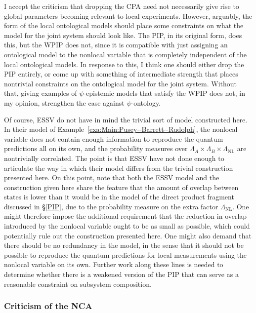 \documentclass[DIV=calc,paper=a4,fontsize=11pt,twocolumn]{scrartcl} %
\theoremstyle{definition}
\theoremstyle{plain}
\begin{document}
I accept the criticism that dropping the CPA need not necessarily give
rise to global parameters becoming relevant to local experiments.
However, arguably, the form of the local ontological models should
place some constraints on what the model for the joint system should
look like.  The PIP, in its original form, does this, but the WPIP
does not, since it is compatible with just assigning an ontological
model to the nonlocal variable that is completely independent of the
local ontological models.  In response to this, I think one should
either drop the PIP entirely, or come up with something of
intermediate strength that places nontrivial constraints on the
ontological model for the joint system.  Without that, giving examples
of $\psi$-epistemic models that satisfy the WPIP does not, in my
opinion, strengthen the case against $\psi$-ontology.

Of course, ESSV do not have in mind the trivial sort of model
constructed here.  In their model of Example~\ref{exa:Main:Pusey--Barrett--Rudolph}, the
nonlocal variable does not contain enough information to reproduce the
quantum predictions all on its own, and the probability measures over
$\Lambda_A \times \Lambda_B \times \Lambda_{\text{NL}}$ are
nontrivially correlated.  The point is that ESSV have not done enough
to articulate the way in which their model differs from the trivial
construction presented here.  On this point, note that both the ESSV
model and the construction given here share the feature that the
amount of overlap between states is lower than it would be in the
model of the direct product fragment discussed in \S\ref{PIP}, due to
the probability measure on the extra factor $\Lambda_{\text{NL}}$.
One might therefore impose the additional requirement that the
reduction in overlap introduced by the nonlocal variable ought to be
as small as possible, which could potentially rule out the
construction presented here.  One might also demand that there should
be no redundancy in the model, in the sense that it should not be
possible to reproduce the quantum predictions for local measurements
using the nonlocal variable on its own.  Further work along these
lines is needed to determine whether there is a weakened version of
the PIP that can serve as a reasonable constraint on subsystem
composition.

\subsubsection{Criticism of the NCA}
\end{document}
